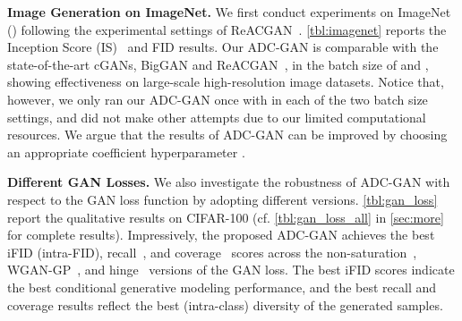 \documentclass[nohyperref]{article}
\theoremstyle{plain}
\theoremstyle{definition}
\theoremstyle{remark}
\begin{document}
\textbf{Image Generation on ImageNet.} We first conduct experiments on ImageNet () following the experimental settings of ReACGAN~\cite{kang2021rebooting}.
\cref{tbl:imagenet} reports the Inception Score (IS)~\cite{NIPS2016_8a3363ab} and FID results.
Our ADC-GAN is comparable with the state-of-the-art cGANs, BigGAN and ReACGAN~\cite{kang2021rebooting}, in the batch size of  and , showing effectiveness on large-scale high-resolution image datasets.
Notice that, however, we only ran our ADC-GAN once with  in each of the two batch size settings, and did not make other attempts due to our limited computational resources.
We argue that the results of ADC-GAN can be improved by choosing an appropriate coefficient hyperparameter .

\textbf{Different GAN Losses.} We also investigate the robustness of ADC-GAN with respect to the GAN loss function  by adopting different versions.
\cref{tbl:gan_loss} report the qualitative results on CIFAR-100 (cf. \cref{tbl:gan_loss_all} in \cref{sec:more} for complete results).
Impressively, the proposed ADC-GAN achieves the best iFID (intra-FID), recall~\cite{NEURIPS2019_0234c510}, and coverage~\cite{pmlr-v119-naeem20a} scores across the non-saturation~\cite{NIPS2014_5ca3e9b1}, WGAN-GP~\cite{NIPS2017_892c3b1c}, and hinge~\cite{lim2017geometric} versions of the GAN loss.
The best iFID scores indicate the best conditional generative modeling performance, and the best recall and coverage results reflect the best (intra-class) diversity of the generated samples.
\end{document}
